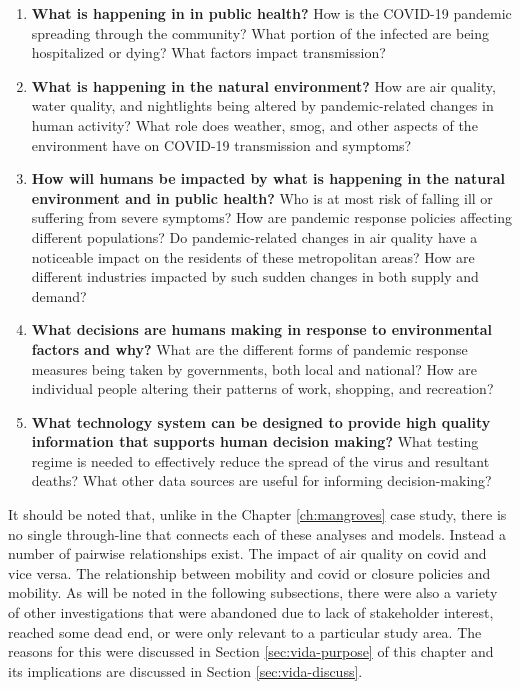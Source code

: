 \begin{enumerate}[itemsep=0pt,parsep=0pt]
	\item \textbf{What is happening in in public health?} How is the COVID-19 pandemic spreading through the community? What portion of the infected are being hospitalized or dying? What factors impact transmission?
	\item \textbf{What is happening in the natural environment?} How are air quality, water quality, and nightlights being altered by pandemic-related changes in human activity? What role does weather, smog, and other aspects of the environment have on COVID-19 transmission and symptoms?
	\item \textbf{How will humans be impacted by what is happening in the natural environment and in public health?} Who is at most risk of falling ill or suffering from severe symptoms? How are pandemic response policies affecting different populations? Do pandemic-related changes in air quality have a noticeable impact on the residents of these metropolitan areas? How are different industries impacted by such sudden changes in both supply and demand?
	\item \textbf{What decisions are humans making in response to environmental factors and why?} What are the different forms of pandemic response measures being taken by governments, both local and national? How are individual people altering their patterns of work, shopping, and recreation?  
	\item \textbf{What technology system can be designed to provide high quality information that supports human decision making?} What testing regime is needed to effectively reduce the spread of the virus and resultant deaths? What other data sources are useful for informing decision-making?
\end{enumerate}

It should be noted that, unlike in the Chapter \ref{ch:mangroves} case study, there is no single through-line that connects each of these analyses and models. Instead a number of pairwise relationships exist. The impact of air quality on \ac{covid} and vice versa. The relationship between mobility and \ac{covid} or closure policies and mobility. As will be noted in the following subsections, there were also a variety of other investigations that were abandoned due to lack of stakeholder interest, reached some dead end, or were only relevant to a particular study area. The reasons for this were discussed in Section \ref{sec:vida-purpose} of this chapter and its implications are discussed in Section \ref{sec:vida-discuss}.

